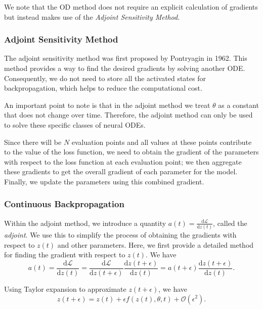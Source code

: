 \documentclass[a4paper,11pt,titlepage]{article}
\theoremstyle{definition}
\theoremstyle{plain}
\theoremstyle{remark}
\begin{document}
We note that the OD method does not require an explicit calculation of gradients but instead makes use of the \textit{Adjoint Sensitivity Method}.

\subsubsection{Adjoint Sensitivity Method}

The adjoint sensitivity method was first proposed by Pontryagin in 1962. This method provides a way to find the desired gradients by solving another ODE. Consequently, we do not need to store all the activated states for backpropagation, which helps to reduce the computational cost. 

An important point to note is that in the adjoint method we treat $\theta$ as a constant that does not change over time. Therefore, the adjoint method can only be used to solve these specific classes of neural ODEs.

Since there will be $N$ evaluation points and all values at these points contribute to the value of the loss function, we need to obtain the gradient of the parameters with respect to the loss function at each evaluation point; we then aggregate these gradients to get the overall gradient of each parameter for the model. Finally, we update the parameters using this combined gradient.

\subsubsection{Continuous Backpropagation}
\label{sec:contback}

Within the adjoint method, we introduce a quantity $a(t) = \frac{\mathrm{d} \mathcal{L}}{\mathrm{d} z(t)}$, called the \textit{adjoint}. We use this to simplify the process of obtaining the gradients with respect to $z(t)$ and other parameters. Here, we first provide a detailed method for finding the gradient with respect to $z(t)$. We have
\begin{equation}\label{eq3}
    a(t) = \frac{\mathrm{d} \mathcal{L}}{\mathrm{d} z(t)} = \frac{\mathrm{d} \mathcal{L}}{\mathrm{d} z(t+\epsilon)}\frac{\mathrm{d} z(t+\epsilon)}{\mathrm{d} z(t)}=a(t+\epsilon)\frac{\mathrm{d} z(t+\epsilon)}{\mathrm{d} z(t)}. \tag{3}
\end{equation}

Using Taylor expansion to approximate $z(t+\epsilon)$, we have
\begin{equation}\label{eq4}
z(t+\epsilon) = z(t)+\epsilon f(z(t),\theta,t) +\mathcal{O}(\epsilon^2). \tag{4}
\end{equation}
\end{document}
